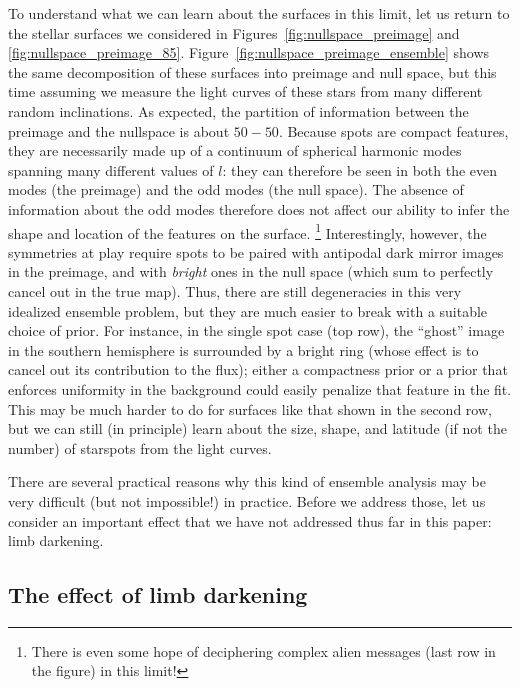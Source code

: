 \documentclass[modern,linenumbers]{aastex62}
\begin{document}
To understand what we can learn about the surfaces in this limit, let us
return to the stellar surfaces we considered in Figures~\ref{fig:nullspace_preimage}
and \ref{fig:nullspace_preimage_85}.
Figure~\ref{fig:nullspace_preimage_ensemble} shows the same decomposition of
these surfaces into preimage and null space, but this time assuming we measure
the light curves of these stars from many different random inclinations.
As expected, the partition of information between the preimage and the nullspace
is about $50{-}50$.
Because spots are compact features, they
are necessarily made up of a continuum of spherical harmonic modes spanning
many different values of $l$: they can therefore be seen in both the even
modes (the preimage) and the odd modes (the null space). The absence of
information about the odd modes therefore does not affect our ability to
infer the shape and location of the features on the surface.%
\footnote{
    There is even some hope of deciphering complex alien messages
    (last row in the figure) in this limit!
}
Interestingly, however,
the symmetries at play require spots to be paired with antipodal dark mirror
images in the preimage, and with \emph{bright} ones in the null space
(which sum to perfectly cancel out in the true map). Thus, there are still
degeneracies in this very idealized ensemble problem, but they are much easier to break
with a suitable choice of prior. For instance, in the single spot case
(top row), the ``ghost'' image in the southern hemisphere is surrounded by
a bright ring (whose effect is to cancel out its contribution to the flux);
either a compactness prior or a prior that enforces uniformity in the
background could easily penalize that feature in the fit. This may be
much harder to do for surfaces like that shown in the second row, but
we can still (in principle) learn about the size, shape, and latitude
(if not the number) of starspots from the light curves.

There are several practical reasons why this kind of ensemble analysis
may be very difficult (but not impossible!) in practice. Before
we address those, let us consider an important effect that we have not
addressed thus far in this paper: limb darkening.

\subsection{The effect of limb darkening}
\label{sec:limbdark}
\end{document}
